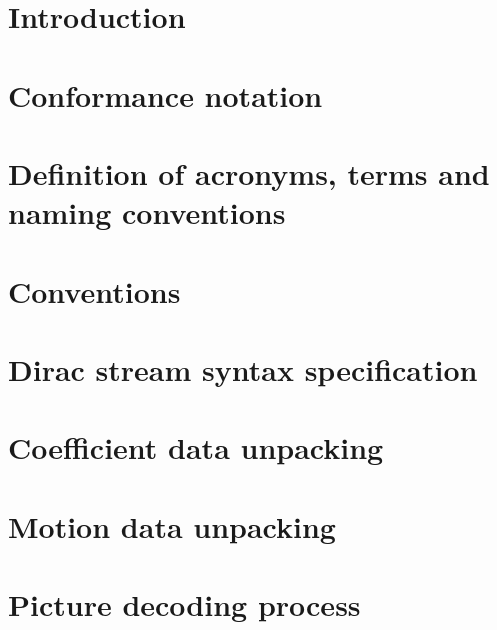 
\section{Introduction}

\clearpage
\section{Conformance notation}

\clearpage
\section{Definition of acronyms, terms and naming conventions}

\clearpage
\section{Conventions}

\clearpage
\section{Dirac stream syntax specification}

\clearpage
\section{Coefficient data unpacking}

\clearpage
\section{Motion data unpacking}


\clearpage
%
\section{Picture decoding process}

